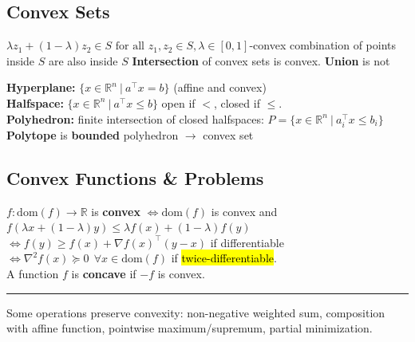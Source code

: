 \documentclass[10pt,a4paper,landscape]{article}
\newcommand{\quadRule}{\vspace{-3pt}\rule{0.23\textwidth}{0.4pt}}
\begin{document}
\begin{multicols*}{4}
\subsection{Convex Sets}
$\lambda z_{1}+(1-\lambda) z_{2} \in S \text { for all } z_{1}, z_{2} \in S, \lambda \in[0,1]$-convex combination of points inside $S$ are also inside $S$
\textbf{Intersection} of convex sets is convex. \textbf{Union} is not

\textbf{Hyperplane:} $ \big\{ x \in \mathbb{R}^n \:|\:a^\top x = b \big\}  $ (affine and convex)\\
\textbf{Halfspace:} $ \big\{ x \in \mathbb{R}^n \:|\:a^\top x \leq b \big\}$ open if $<$, closed if $\leq$.\\
\textbf{Polyhedron:} finite intersection of closed halfspaces: 
$ P = \big\{ x \in \mathbb{R}^n \:|\:a_i^\top x \leq b_i \big\}$\\
\textbf{Polytope} is \textbf{bounded} polyhedron $\rightarrow$ convex set\\

\subsection{Convex Functions \& Problems}
$f: \mathrm{dom}(f) \rightarrow \mathbb{R}$ is \textbf{convex} $ \iff \mathrm{dom}(f)$ is convex and $f(\lambda x + (1 - \lambda) y) \leq \lambda f(x) + (1 - \lambda)f(y)$\\
$\iff f(y) \geq f(x) + \nabla f(x)^\top (y-x)$ if differentiable\\
$\iff \nabla ^2 f(x) \succeq 0 \:\: \forall x \in \mathrm{dom}(f)$ if \hl{twice-differentiable}.\\
A function $f$ is \textbf{concave} if $-f$ is convex.

%

\quadRule

Some operations preserve convexity: non-negative weighted sum, composition with affine function, pointwise maximum/supremum, partial minimization.


\end{multicols*}
\end{document}
